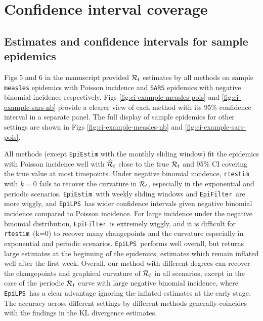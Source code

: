 \documentclass[
]{article}
\begin{document}
\clearpage

\hypertarget{confidence-interval-coverage}{%
\section{Confidence interval coverage}\label{confidence-interval-coverage}}

\hypertarget{sec:samples}{%
\subsection{Estimates and confidence intervals for sample epidemics}\label{sec:samples}}

Figs 5 and 6 in the manuscript provided \(\mathcal{R}_t\) estimates by all methods on
sample \texttt{measles} epidemics with Poisson incidence and \texttt{SARS} epidemics with negative
binomial incidence respectively. Figs \ref{fig:ci-example-measles-pois} and
\ref{fig:ci-example-sars-nb} provide a clearer view of each method with its
95\% confidence interval in a separate panel. The full display of sample epidemics
for other settings are shown in Figs \ref{fig:ci-example-measles-nb} and
\ref{fig:ci-example-sars-pois}.

All methods (except \texttt{EpiEstim} with the monthly sliding window) fit the epidemics
with Poisson incidence well with \(\widehat{\mathcal{R}}_t\) close to the true
\(\mathcal{R}_t\) and 95\% CI covering the true value at most timepoints.
Under negative binomial incidence, \texttt{rtestim} with \(k=0\) fails to recover the
curvature in \(\mathcal{R}_t\), especially in the exponential and periodic scenarios.
\texttt{EpiEstim}~with weekly sliding windows and \texttt{EpiFilter}~are more wiggly, and
\texttt{EpiLPS}~has wider confidence intervals given negative binomial incidence
compared to Poisson incidence. For large incidence under the negative binomial distribution,
\texttt{EpiFilter}~is extremely wiggly, and it is difficult for \texttt{rtestim}~(k=0) to recover
many changepoints and the curvature especially in exponential and periodic scenarios.
\texttt{EpiLPS}~performs well overall, but returns large estimates at the beginning of
the epidemics, estimates which remain inflated well after the first week. Overall, our method with different
degrees can recover the changepoints and graphical curvature of \(\mathcal{R}_t\) in all
scenarios, except in the case of the periodic \(\mathcal{R}_t\) curve with large negative binomial incidence, where \texttt{EpiLPS}~has a clear advantage ignoring the inflated estimates at the early stage.
The accuracy across different settings by different methods
generally coincides with the findings in the KL divergence estimates.
\end{document}
